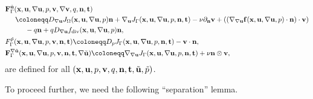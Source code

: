 \documentclass[oneside,11pt]{book}
\numberwithin{equation}{section}
\begin{document}
\begin{enumerate}[leftmargin=0mm]
\begin{itemize}[leftmargin=0in]
\begin{align*}
            &{\bf F}_\Gamma^{\tilde{\bf u}}({\bf x},{\bf u},\nabla{\bf u},p,{\bf v},\nabla{\bf v},q,{\bf n},{\bf t})\\
            &\hspace{5mm}\coloneqq D_{\nabla{\bf u}}J_\Omega({\bf x},{\bf u},\nabla{\bf u},p){\bf n} + \nabla_{\bf u}J_\Gamma({\bf x},{\bf u},\nabla{\bf u},p,{\bf n},{\bf t}) - \nu\partial_{\bf n}{\bf v} + ((\nabla_{\nabla{\bf u}}{\bf f}({\bf x},{\bf u},\nabla{\bf u},p)\cdot{\bf n})\cdot{\bf v})\\
            &\hspace{1cm}- q{\bf n} + qD_{\nabla{\bf u}}f_{\rm div}({\bf x},{\bf u},\nabla{\bf u},p){\bf n},\\
            &F_\Gamma^{\tilde{p}}({\bf x},{\bf u},\nabla{\bf u},p,{\bf v},{\bf n},{\bf t})\coloneqq D_pJ_\Gamma({\bf x},{\bf u},\nabla{\bf u},p,{\bf n},{\bf t}) - {\bf v}\cdot{\bf n},\\
            &{\bf F}_\Gamma^{\nabla\tilde{\bf u}}({\bf x},{\bf u},\nabla{\bf u},p,{\bf v},{\bf n},{\bf t},\nabla\tilde{\bf u})\coloneqq\nabla_{\nabla{\bf u}}J_\Gamma({\bf x},{\bf u},\nabla{\bf u},p,{\bf n},{\bf t}) + \nu{\bf n}\otimes{\bf v},
        \end{align*}
        are defined for all $({\bf x},{\bf u},p,{\bf v},q,{\bf n},{\bf t},\tilde{\bf u},\tilde{p})$.
        
        To proceed further, we need the following ``separation'' lemma.
        

\end{itemize}
\end{enumerate}
\end{document}
